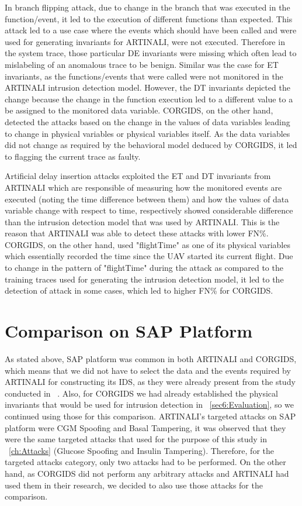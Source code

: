 In branch flipping attack, due to change in the branch that was executed in the function/event, it led to the execution of different functions than expected. This attack led to a use case where the events which should have been called and were used for generating invariants for ARTINALI, were not executed. Therefore in the system trace, those particular D\textbar E invariants were missing which often lead to mislabeling of an anomalous trace to be benign. Similar was the case for E\textbar T invariants, as the functions/events that were called were not monitored in the ARTINALI intrusion detection model. However, the D\textbar T invariants depicted the change because the change in the function execution led to a different value to a be assigned to the monitored data variable. \ac{CORGIDS}, on the other hand, detected the attacks based on the change in the values of data variables leading to change in physical variables or physical variables itself. As the data variables did not change as required by the behavioral model deduced by \ac{CORGIDS}, it led to flagging the current trace as faulty.

Artificial delay insertion attacks exploited the E\textbar T and D\textbar T invariants from ARTINALI which are responsible of measuring how the monitored events are executed (noting the time difference between them) and how the values of data variable change with respect to time, respectively showed considerable difference than the intrusion detection model that was used by ARTINALI. This is the reason that ARTINALI was able to detect these attacks with lower \ac{FN}\%. \ac{CORGIDS}, on the other hand, used "flightTime" as one of its physical variables which essentially recorded the time since the \ac{UAV} started its current flight. Due to change in the pattern of "flightTime" during the attack as compared to the training traces used for generating the intrusion detection model, it led to the detection of attack in some cases, which led to higher \ac{FN}\% for \ac{CORGIDS}.


\section{Comparison on \ac{SAP} Platform}
As stated above, \ac{SAP} platform was common in both ARTINALI and \ac{CORGIDS}, which means that we did not have to select the data and the events required by ARTINALI for constructing its \ac{IDS}, as they were already present from the study conducted in ~\cite{aliabadi2017artinali}. Also, for \ac{CORGIDS} we had already established the physical invariants that would be used for intrusion detection in ~\autoref{sec6:Evaluation}, so we continued using those for this comparison. ARTINALI's targeted attacks on \ac{SAP} platform were \ac{CGM} Spoofing and Basal Tampering, it was observed that they were the same targeted attacks that used for the purpose of this study in ~\autoref{ch:Attacks} (Glucose Spoofing and Insulin Tampering). Therefore, for the targeted attacks category, only two attacks had to be performed. On the other hand, as \ac{CORGIDS} did not perform any arbitrary attacks and ARTINALI had used them in their research, we decided to also use those attacks for the comparison.

